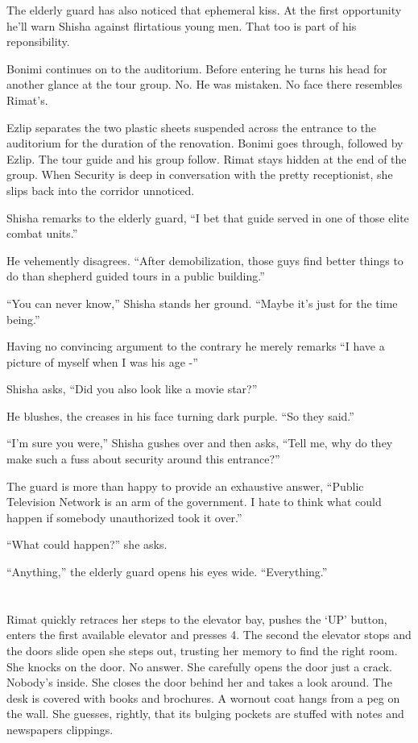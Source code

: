 \documentclass[twoside,11pt]{book}
\begin{document}
The elderly guard has also noticed that ephemeral kiss. At the first opportunity he'll warn Shisha
against flirtatious young men. That too is part of his reponsibility.

Bonimi continues on to the auditorium. Before entering he turns his head for another glance at the tour group. No. He
was mistaken. No face there resembles Rimat's.

Ezlip separates the two plastic sheets suspended across the entrance to the auditorium for the duration of the
renovation. Bonimi goes through, followed by Ezlip. The tour guide and his group follow. Rimat stays hidden at the end
of the group. When Security is deep in conversation with the pretty receptionist, she slips back into the corridor
unnoticed.

Shisha remarks to the elderly guard, ``I bet that guide served in one of those elite combat
units.''

He vehemently disagrees. ``After demobilization, those guys find better things to do than shepherd guided
tours in a public building.''

``You can never know,'' Shisha stands her ground. ``Maybe it's just for the time
being.''

Having no convincing argument to the contrary he merely remarks ``I have a picture of myself when I was his
age -''

Shisha asks, ``Did you also look like a movie star?''

He blushes, the creases in his face turning dark purple. ``So they said.''

``I'm sure you were,'' Shisha gushes over and then asks, ``Tell me, why do they
make such a fuss about security around this entrance?''

The guard is more than happy to provide an exhaustive answer, ``Public Television Network is an arm of
the government. I hate to think what could happen if somebody unauthorized took it over.''

``What could happen?'' she asks.

``Anything,'' the elderly guard opens his eyes wide. ``Everything.''



\chapter{}

Rimat quickly retraces her steps to the elevator bay, pushes the `UP' button, enters the first available elevator and
presses 4. The second the elevator stops and the doors slide open she steps out, trusting her memory to find the right
room. She knocks on the door. No answer. She carefully opens the door just a crack. Nobody's inside. She closes the
door behind her and takes a look around. The desk is covered with books and brochures. A wornout coat hangs from a peg
on the wall. She guesses, rightly, that its bulging pockets are stuffed with notes and newspapers
clippings.
\end{document}
